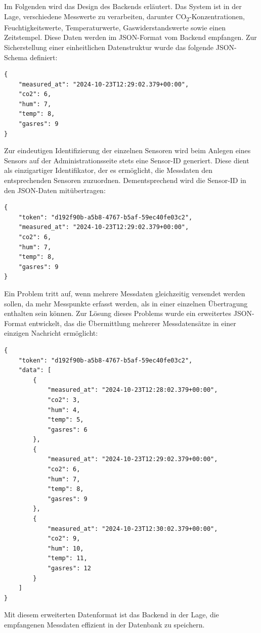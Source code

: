 \begin{inhalt}
Im Folgenden wird das Design des Backends erläutert. Das System ist in der Lage, verschiedene Messwerte zu verarbeiten, darunter CO\textsubscript{2}-Konzentrationen, Feuchtigkeitswerte, Temperaturwerte, Gaswiderstandswerte sowie einen Zeitstempel. Diese Daten werden im JSON-Format vom Backend empfangen. Zur Sicherstellung einer einheitlichen Datenstruktur wurde das folgende JSON-Schema definiert:

\begin{lstlisting}[style=myjson]
{
    "measured_at": "2024-10-23T12:29:02.379+00:00",
    "co2": 6,
    "hum": 7,
    "temp": 8,
    "gasres": 9
}
\end{lstlisting}

Zur eindeutigen Identifizierung der einzelnen Sensoren wird beim Anlegen eines Sensors auf der Administrationsseite stets eine Sensor-ID generiert. Diese dient als einzigartiger Identifikator, der es ermöglicht, die Messdaten den entsprechenden Sensoren zuzuordnen. Dementsprechend wird die Sensor-ID in den JSON-Daten mitübertragen:

\begin{lstlisting}[style=myjson]
{
    "token": "d192f90b-a5b8-4767-b5af-59ec40fe03c2",
    "measured_at": "2024-10-23T12:29:02.379+00:00",
    "co2": 6,
    "hum": 7,
    "temp": 8,
    "gasres": 9
}
\end{lstlisting}

Ein Problem tritt auf, wenn mehrere Messdaten gleichzeitig versendet werden sollen, da mehr Messpunkte erfasst werden, als in einer einzelnen Übertragung enthalten sein können. Zur Lösung dieses Problems wurde ein erweitertes JSON-Format entwickelt, das die Übermittlung mehrerer Messdatensätze in einer einzigen Nachricht ermöglicht:

\begin{lstlisting}[style=myjson]
{
    "token": "d192f90b-a5b8-4767-b5af-59ec40fe03c2",
    "data": [
        {
            "measured_at": "2024-10-23T12:28:02.379+00:00",
            "co2": 3,
            "hum": 4,
            "temp": 5,
            "gasres": 6
        },
        {
            "measured_at": "2024-10-23T12:29:02.379+00:00",
            "co2": 6,
            "hum": 7,
            "temp": 8,
            "gasres": 9
        },
        {
            "measured_at": "2024-10-23T12:30:02.379+00:00",
            "co2": 9,
            "hum": 10,
            "temp": 11,
            "gasres": 12
        }
    ]
}
\end{lstlisting}

Mit diesem erweiterten Datenformat ist das Backend in der Lage, die empfangenen Messdaten effizient in der Datenbank zu speichern.


\end{inhalt}
